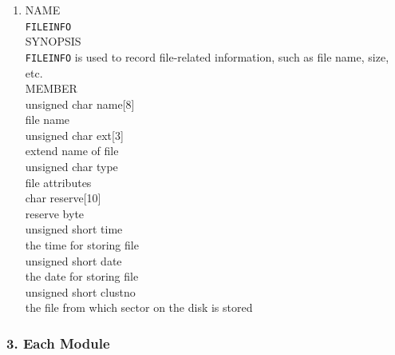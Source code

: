 \documentclass{swfcthesis}
\begin{document}
\begin{enumerate}
\item
  NAME \\
  \hspace*{1cm}\texttt{FILEINFO} \\
  SYNOPSIS \\
  \hspace*{1cm} \texttt{FILEINFO} is used to record file-related information, such as file name, size, etc.\\
  MEMBER \\
  \hspace*{1cm} unsigned char name[8]\\
  \hspace*{1.5cm}  file name\\
  \hspace*{1cm} unsigned char ext[3]\\
  \hspace*{1.5cm} extend name of file\\
  \hspace*{1cm} unsigned char type\\
  \hspace*{1.5cm}  file attributes\\
  \hspace*{1cm} char reserve[10]\\
  \hspace*{1.5cm} reserve byte\\
  \hspace*{1cm}  unsigned short time\\
  \hspace*{1.5cm} the time for storing file\\
  \hspace*{1cm} unsigned short date\\
  \hspace*{1.5cm}  the date for storing file\\
  \hspace*{1cm} unsigned short  clustno\\
  \hspace*{1.5cm}the file from which sector on the disk is stored \\


\end{enumerate}
    
\subsubsection{3. Each Module}
\label{sec:3.-modules-kernel}
\end{document}
